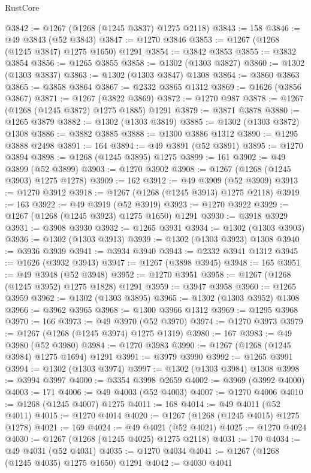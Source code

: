 \begin{lexlean}{RustCore}
\begin{coremodule}
@3842 := @1267 (@1268 (@1245 @3837) @1275 @2118)
@3843 := 158
@3846 := @49 @3843 (@52 @3843)
@3847 := @1270 @3846
@3853 := @1267 (@1268 (@1245 @3847) @1275 @1650) @1291
@3854 := @3842 @3853
@3855 := @3832 @3854
@3856 := @1265 @3855
@3858 := @1302 (@1303 @3827)
@3860 := @1302 (@1303 @3837)
@3863 := @1302 (@1303 @3847) @1308
@3864 := @3860 @3863
@3865 := @3858 @3864
@3867 := @2332 @3865 @1312
@3869 := @1626 (@3856 @3867)
@3871 := @1267 (@3822 @3869)
@3872 := @1270 @987
@3878 := @1267 (@1268 (@1245 @3872) @1275 @1885) @1291
@3879 := @3871 @3878
@3880 := @1265 @3879
@3882 := @1302 (@1303 @3819)
@3885 := @1302 (@1303 @3872) @1308
@3886 := @3882 @3885
@3888 := @1300 @3886 @1312
@3890 := @1295 @3888 @2498
@3891 := 164
@3894 := @49 @3891 (@52 @3891)
@3895 := @1270 @3894
@3898 := @1268 (@1245 @3895) @1275
@3899 := 161
@3902 := @49 @3899 (@52 @3899)
@3903 := @1270 @3902
@3908 := @1267 (@1268 (@1245 @3903) @1275 @1278)
@3909 := 162
@3912 := @49 @3909 (@52 @3909)
@3913 := @1270 @3912
@3918 := @1267 (@1268 (@1245 @3913) @1275 @2118)
@3919 := 163
@3922 := @49 @3919 (@52 @3919)
@3923 := @1270 @3922
@3929 := @1267 (@1268 (@1245 @3923) @1275 @1650) @1291
@3930 := @3918 @3929
@3931 := @3908 @3930
@3932 := @1265 @3931
@3934 := @1302 (@1303 @3903)
@3936 := @1302 (@1303 @3913)
@3939 := @1302 (@1303 @3923) @1308
@3940 := @3936 @3939
@3941 := @3934 @3940
@3943 := @2332 @3941 @1312
@3945 := @1626 (@3932 @3943)
@3947 := @1267 (@3898 @3945)
@3948 := 165
@3951 := @49 @3948 (@52 @3948)
@3952 := @1270 @3951
@3958 := @1267 (@1268 (@1245 @3952) @1275 @1828) @1291
@3959 := @3947 @3958
@3960 := @1265 @3959
@3962 := @1302 (@1303 @3895)
@3965 := @1302 (@1303 @3952) @1308
@3966 := @3962 @3965
@3968 := @1300 @3966 @1312
@3969 := @1295 @3968
@3970 := 166
@3973 := @49 @3970 (@52 @3970)
@3974 := @1270 @3973
@3979 := @1267 (@1268 (@1245 @3974) @1275 @1319)
@3980 := 167
@3983 := @49 @3980 (@52 @3980)
@3984 := @1270 @3983
@3990 := @1267 (@1268 (@1245 @3984) @1275 @1694) @1291
@3991 := @3979 @3990
@3992 := @1265 @3991
@3994 := @1302 (@1303 @3974)
@3997 := @1302 (@1303 @3984) @1308
@3998 := @3994 @3997
@4000 := @3354 @3998 @2659
@4002 := @3969 (@3992 @4000)
@4003 := 171
@4006 := @49 @4003 (@52 @4003)
@4007 := @1270 @4006
@4010 := @1268 (@1245 @4007) @1275
@4011 := 168
@4014 := @49 @4011 (@52 @4011)
@4015 := @1270 @4014
@4020 := @1267 (@1268 (@1245 @4015) @1275 @1278)
@4021 := 169
@4024 := @49 @4021 (@52 @4021)
@4025 := @1270 @4024
@4030 := @1267 (@1268 (@1245 @4025) @1275 @2118)
@4031 := 170
@4034 := @49 @4031 (@52 @4031)
@4035 := @1270 @4034
@4041 := @1267 (@1268 (@1245 @4035) @1275 @1650) @1291
@4042 := @4030 @4041

\end{coremodule}
\end{lexlean}
